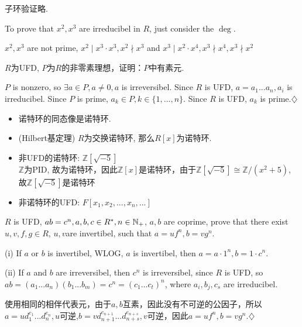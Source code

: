 \documentclass{report}
\begin{document}
\sol
{

    子环验证略.

    To prove that $x^2,x^3$ are irreducibel in $R$, just consider the $\deg$.

    $x^2,x^3$ are not prime, $x^2\mid x^3 \cdot x^3, x^2 \nmid x^3$ and $x^3 \mid x^2\cdot x^4, x^3 \nmid x^4, x^3\nmid x^2$
}

{
    $R$为UFD, $P$为$R$的非零素理想，证明：$P$中有素元.
}

\sol
{

    $P$ is nonzero, so $\exists a \in P, a\neq 0, a$ is irreversibel. Since $R$ is UFD, $a=a_1...a_n, a_i$ is irreducibel. Since $P$ is prime, $a_k \in P, k \in \{1,...,n\}$. Since $R$ is UFD, $a_k$ is prime.$\diamondsuit$
}


\begin{note}
    \begin{itemize}
        \item 诺特环的同态像是诺特环.
        \item (Hilbert基定理) $R$为交换诺特环, 那么$R[x]$为诺特环.
        \item 非UFD的诺特环: $\mathbb{Z}[\sqrt{-5}]$\\ $\mathbb{Z}$为PID, 故为诺特环，因此$\mathbb{Z}[x]$是诺特环，由于$\mathbb{Z}[\sqrt{-5}] \cong \mathbb{Z}/(x^2+5)$, 故$\mathbb{Z}[\sqrt{-5}]$是诺特环
        \item 非诺特环的UFD: $F[x_1,x_2,...,x_n,...]$
    \end{itemize}
\end{note}

{
    $R$ is UFD, $ab=c^n, a,b,c \in R^*, n \in \mathbb{N}_+$, $a,b$ are coprime, prove that there exist $u,v,f,g \in R$, $u,v$are invertibel, such that $a=uf^n, b=vg^n$.
}

\sol
{

    (i) If $a$ or $b$ is invertibel, WLOG, $a$ is invertibel, then $a=a\cdot 1^n, b=1 \cdot c^n$.

    (ii) If $a$ and $b$ are irreversibel, then $c^n$ is irreversibel, since $R$ is UFD, so $ab=(a_1...a_n)(b_1...b_m)=c^n=(c_1...c_t)^n$, where $a_i,b_j,c_s$ are irreducibel.

    使用相同的相伴代表元，由于$a,b$互素，因此没有不可逆的公因子，所以$a=ud_1^{e_1}...d_n^{e_n}, u$可逆,$b=vd_{n+1}^{e_{n+1}}...d_{n+s}^{e_{n+s}}, v$可逆，因此$a=uf^n,b=vg^n$.$\diamondsuit$
}

\end{document}
